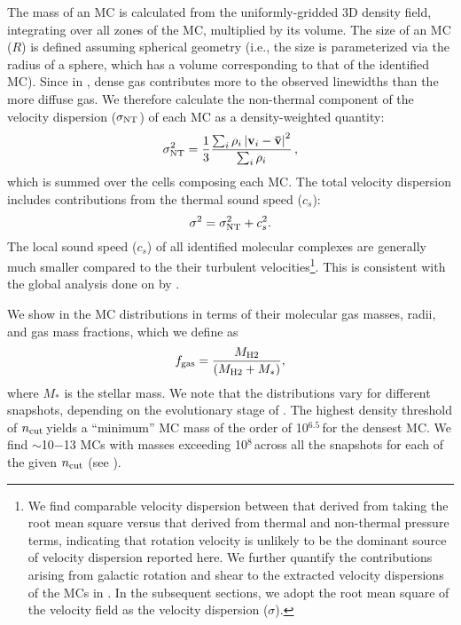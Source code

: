 \IfFileExists{emulateapjlegacy.cls}{\documentclass[iop]{emulateapjlegacy}}{\documentclass[iop]{emulateapj}}
\newcommand{\AP}[1]{({\bf \color{apcolor} AP: #1})}
\begin{document}
The mass of an MC is calculated from the uniformly-gridded 3D density field,
integrating over all zones of the MC, multiplied by its volume. 
The size of an MC ($R$) is defined assuming spherical geometry (i.e., 
the size is parameterized via the radius of a sphere, which has a volume corresponding to that of the identified MC).
Since in \obs, dense gas contributes more to the observed linewidths than the more diffuse gas. We therefore calculate 
the non-thermal component of the velocity dispersion ($\sigma_{\rm NT}$) of each MC as a density-weighted quantity:
\begin{equation}
\sigma_{\rm NT}^2 = \frac{1}{{3}}\frac{\sum_{i} \rho_i \left|\mathbf{v}_i - \mathbf{\bar v}\right|^2}{\sum_i \rho_i}\,,
\end{equation}
which is summed over the cells composing each MC.
The total velocity dispersion includes contributions from the thermal sound speed ($c_s$):
\begin{equation}
\sigma^2 = \sigma_{\rm NT}^2 + c_s^2.
\end{equation}
The local sound speed ($c_s$)
of all identified molecular complexes are generally much smaller compared to the their
turbulent velocities\footnote{We find comparable velocity dispersion between that derived from 
taking the root mean square versus that derived from thermal and non-thermal pressure terms, indicating that
rotation velocity is unlikely to be the dominant source of velocity dispersion reported here.
We further quantify the contributions arising from galactic rotation and shear to the extracted velocity dispersions of the MCs in .
In the subsequent sections, we adopt the root mean square of the velocity field
as the velocity dispersion ($\sigma$).}.
This is consistent with the global analysis done on \flower by \citet{Vallini18a}.


We show in  the MC distributions in terms of their
molecular gas masses, radii, and gas mass fractions, which we define as 
\begin{equation}
f_{\rm gas} = \frac{M_{\rm H2}} {\left(M_{\rm H2} + M_*\right)},
\end{equation}
where $M_*$ is the stellar mass.
We note that the distributions vary for different snapshots, depending on the evolutionary stage of \flower.
The highest density threshold of $n_{\rm cut}$\,\cc yields a ``minimum'' MC mass of
the order of 10$^{6.5}$\,\Msun for the densest MC.
We find $\sim$10$-$13 MCs with masses exceeding 10$^8$\,\Msun across all the
snapshots for each of the given $n_{\rm cut}$ (see ).
\end{document}

